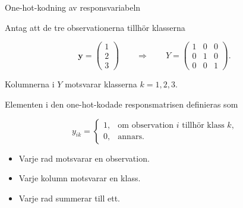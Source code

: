 \documentclass[10pt,english]{beamer}
\begin{document}
\begin{frame}{One-hot-kodning av responsvariabeln}

    Antag att de tre observationerna tillhör klasserna

    \[
        \boldsymbol{y}
        =
        \begin{pmatrix}
            1 \\
            2 \\
            3
        \end{pmatrix}
        \qquad
        \Longrightarrow
        \qquad
        Y
        =
        \begin{pmatrix}
            1 & 0 & 0 \\
            0 & 1 & 0 \\
            0 & 0 & 1
        \end{pmatrix}.
    \]

    Kolumnerna i \(Y\) motsvarar klasserna \(k=1,2,3\).

    \medskip

    Elementen i den one-hot-kodade responsmatrisen definieras som

    \[
        y_{ik}
        =
        \begin{cases}
            1, & \text{om observation \(i\) tillhör klass \(k\),} \\
            0, & \text{annars.}
        \end{cases}
    \]

    \begin{itemize}
        \item Varje rad motsvarar en observation.
        \item Varje kolumn motsvarar en klass.
        \item Varje rad summerar till ett.
    \end{itemize}

\end{frame}
\end{document}
